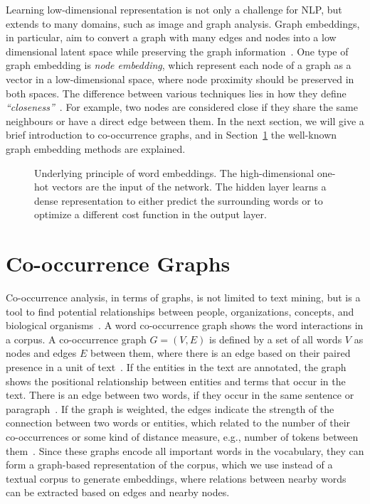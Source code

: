 \noindent
Learning low-dimensional representation is not only a challenge for NLP, but extends to many domains, such as image and graph analysis. Graph embeddings, in particular,  aim to convert a graph with many edges and nodes into a low dimensional latent space while preserving the graph information~. One type of graph embedding is \emph{node embedding}, which represent each node of a graph as a vector in a low-dimensional space, where node proximity should be preserved in both spaces.
The difference between various techniques lies in how they define \emph{``closeness''}~. For example, two nodes are considered close if they share the same neighbours or have a direct edge between them. In the next section, we will give a brief introduction to co-occurrence graphs, and in Section~\ref{sec:graph} the well-known graph embedding methods are explained.  
\begin{figure}
\centering 
\resizebox{0.8\textwidth}{0.48\textwidth}{      

}
\caption{Underlying principle of word embeddings. The high-dimensional one-hot vectors are the input of the network. The hidden layer learns a dense representation to either predict the surrounding words or to optimize a different cost function in the output layer.}
\label{fig:emb}
\end{figure}
\section{Co-occurrence Graphs}
\label{sec:graph}
Co-occurrence analysis, in terms of graphs, is not limited to text mining, but is a tool to find potential relationships between people, organizations, concepts, and biological organisms~. A word co-occurrence graph shows the word interactions in a corpus. A co-occurrence graph $G=(V,E)$ is defined by a set of all words $V$ as nodes and edges $E$ between them, where there is an edge based on their paired presence in a unit of text~. If the entities in the text are annotated, the graph shows the positional relationship between entities and terms that occur in the text. There is an edge between two words, if they occur in the same sentence or paragraph~. If the graph is weighted, the edges indicate the strength of the connection between two words or entities, which related to the number of their co-occurrences or some kind of distance measure, e.g., number of tokens between them~. Since these graphs encode all important words in the vocabulary, they can form a graph-based representation of the corpus, which we use instead of a textual corpus to generate embeddings, where relations between nearby words can be extracted based on edges and nearby nodes.\\

